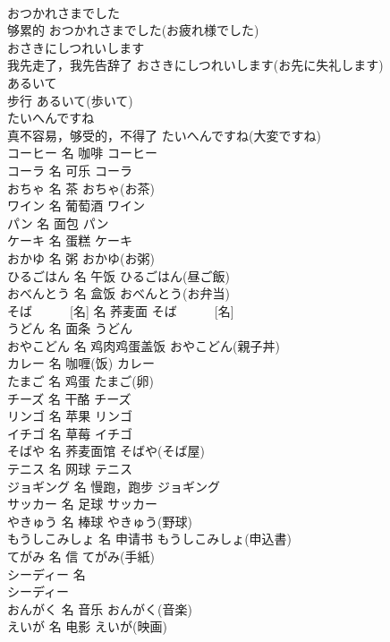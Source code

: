 \documentclass[8pt]{extreport}
\begin{document}
\begin{CJK}{UTF8}{min}
\\	おつかれさまでした	
\\	够累的	おつかれさまでした(お疲れ様でした)	
\\	おさきにしつれいします	
\\	我先走了，我先告辞了	おさきにしつれいします(お先に失礼します)	
\\	あるいて	
\\	步行	あるいて(歩いて)	
\\	たいへんですね	
\\	真不容易，够受的，不得了	たいへんですね(大変ですね)	
\\	コーヒー	名	咖啡	コーヒー	
\\	コーラ	名	可乐	コーラ	
\\	おちゃ	名	茶	おちゃ(お茶)	
\\	ワイン	名	葡萄酒	ワイン	
\\	パン	名	面包	パン	
\\	ケーキ	名	蛋糕	ケーキ	
\\	おかゆ	名	粥	おかゆ(お粥)	
\\	ひるごはん	名	午饭	ひるごはん(昼ご飯)	
\\	おべんとう	名	盒饭	おべんとう(お弁当)	
\\	そば　　　[名]	名	荞麦面	そば　　　[名]	
\\	うどん	名	面条	うどん	
\\	おやこどん	名	鸡肉鸡蛋盖饭	おやこどん(親子丼)	
\\	カレー	名	咖喱(饭)	カレー	
\\	たまご	名	鸡蛋	たまご(卵)	
\\	チーズ	名	干酪	チーズ	
\\	リンゴ	名	苹果	リンゴ	
\\	イチゴ	名	草莓	イチゴ	
\\	そばや	名	荞麦面馆	そばや(そば屋)	
\\	テニス	名	网球	テニス	
\\	ジョギング	名	慢跑，跑步	ジョギング	
\\	サッカー	名	足球	サッカー	
\\	やきゅう	名	棒球	やきゅう(野球)	
\\	もうしこみしょ	名	申请书	もうしこみしょ(申込書)	
\\	てがみ	名	信	てがみ(手紙)	
\\	シーディー	名	
\\	シーディー
\\	おんがく	名	音乐	おんがく(音楽)	
\\	えいが	名	电影	えいが(映画)	

\end{CJK}
\end{document}
